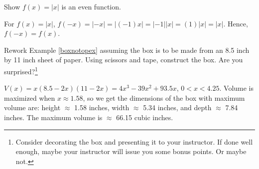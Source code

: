 \documentclass{ximera}
\begin{document}
\begin{problem}
Show $f(x) = |x|$ is an even function.

\begin{solution}
    For $f(x) = |x|$, $f(-x) = |-x| = |(-1) x|  = |-1| |x| = (1) |x| = |x|$.  Hence, $f(-x) = f(x)$.
\end{solution}

\end{problem}

\begin{problem}
Rework Example \ref{boxnotopex} assuming the box is to be made from an 8.5 inch by 11 inch sheet of paper. Using scissors and tape, construct the box.  Are you surprised?\footnote{Consider decorating the box and presenting it to your instructor. If done well enough, maybe your instructor will issue you some bonus points.  Or maybe not.}

\begin{solution}
    $V(x) = x(8.5-2x)(11-2x) = 4x^3-39x^2+93.5x$, $0 < x < 4.25$.  Volume is maximized when $x \approx 1.58$, so we get the dimensions of the box with maximum volume are: height $\approx$ 1.58 inches, width $\approx$ 5.34 inches, and depth $\approx$ 7.84 inches.  The maximum volume is $\approx$ 66.15 cubic inches.
\end{solution}

\end{problem}
\end{document}
